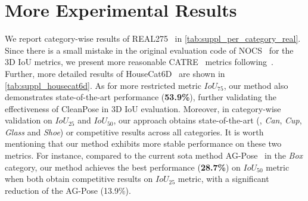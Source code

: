 \section{More Experimental Results}
\label{sec:suppl_more_results}
We report category-wise results of REAL275~\cite{wang2019normalized} in \cref{tab:suppl_per_category_real}. Since there is a small mistake in the original evaluation code of NOCS~\cite{wang2019normalized} for the 3D IoU metrics, we present more reasonable CATRE~\cite{liu2022catre} metrics following~\cite{zheng2024georef,liu2024mh6d,chen2024secondpose}. 
Further, more detailed results of HouseCat6D~\cite{jung2024housecat6d} are shown in \cref{tab:suppl_housecat6d}. As for more restricted metric $IoU_{75}$, our method also demonstrates state-of-the-art performance (\textbf{53.9\%}), further validating the effectiveness of CleanPose in 3D IoU evaluation.
Moreover, in category-wise validation on $IoU_{25}$ and $IoU_{50}$, our approach obtains state-of-the-art (\eg, \emph{Can}, \emph{Cup}, \emph{Glass} and \emph{Shoe}) or competitive results across all categories. 
It is worth mentioning that our method exhibits more stable performance on these two metrics. For instance, compared to the current sota method AG-Pose~\cite{lin2024instance} in the \emph{Box} category, our method achieves the best performance (\textbf{28.7\%}) on $IoU_{50}$ metric when both obtain competitive results on $IoU_{25}$ metric, with a significant reduction of the AG-Pose (13.9\%).











